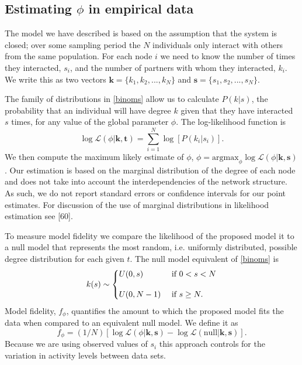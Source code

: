 \documentclass[twocolumn,8pt]{article}
\begin{document}
\subsection{Estimating $\phi$ in empirical data}
\label{fitting}
The model we have described is based on the assumption that the system is closed; over some sampling period the $N$ individuals only interact with others from the same population. For each node $i$ we need to know the number of times they interacted, $s_{i}$, and the number of partners with whom they interacted, $k_{i}$. We write this as two vectors $\textbf{k}=\{k_{1},k_{2},...,k_{N}\}$ and $\textbf{s}=\{s_{1},s_{2},...,s_{N}\}$.

The family of distributions in \eqref{binoms} allow us to calculate $P(k|s)$, the probability that an individual will have degree $k$ given that they have interacted $s$ times, for any value of the global parameter $\phi$. The log-likelihood function is
\begin{equation}
\log \mathcal{L}(\phi|\textbf{k},\textbf{t})=\sum_{i=1}^{N}\log[P(k_{i}|s_{i})].
\end{equation}
We then compute the maximum likely estimate of $\phi$, $\phi=\text{argmax}_{\phi}\log \mathcal{L}(\phi|\textbf{k},\textbf{s})$.  Our estimation is based on the marginal distribution of the degree of each node and does not take into account the interdependencies of the network structure. As such, we do not report standard errors or confidence intervals for our point estimates. For discussion of the use of marginal distributions in likelihood estimation see [60].

To measure model fidelity we compare the likelihood of the proposed model it to a null model that represents the most random, i.e. uniformly distributed, possible degree distribution for each given $t$. The null model equivalent of \eqref{binoms} is
\begin{equation}
\label{uniforms}
k(s) \sim 
   \begin{dcases}
    U(0,s) & \text{ if }0<s<N\\[10pt]
    U(0,N-1) & \text{ if } s \geq N.
  \end{dcases}
\end{equation}
Model fidelity, $f_{\phi}$, quantifies the amount to which the proposed model fits the data when compared to an equivalent null model. We define it as
\begin{equation}
\label{fidelity}
f_{\phi}=(1/N)[\log \mathcal{L}(\phi|\textbf{k},\textbf{s})-\log \mathcal{L}(\text{null}|\textbf{k},\textbf{s})].
\end{equation}
Because we are using observed values of $s_{i}$ this approach controls for the variation in activity levels between data sets.
\end{document}
